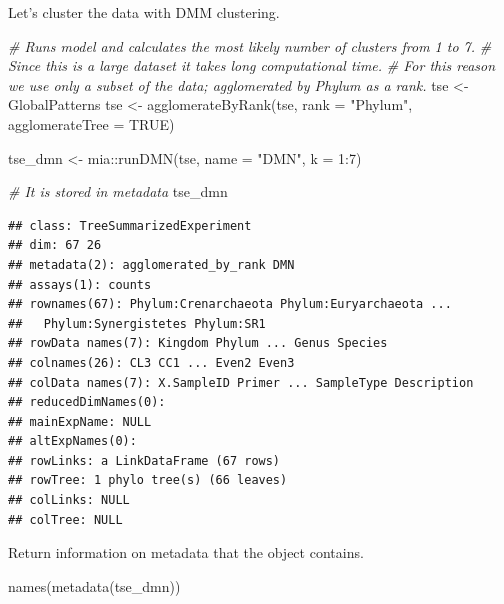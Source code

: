 \documentclass[
]{book}
\newenvironment{Shaded}{\begin{snugshade}}{\end{snugshade}}
\newcommand{\AttributeTok}[1]{\textcolor[rgb]{0.77,0.63,0.00}{#1}}
\newcommand{\CommentTok}[1]{\textcolor[rgb]{0.56,0.35,0.01}{\textit{#1}}}
\newcommand{\ConstantTok}[1]{\textcolor[rgb]{0.00,0.00,0.00}{#1}}
\newcommand{\DecValTok}[1]{\textcolor[rgb]{0.00,0.00,0.81}{#1}}
\newcommand{\FunctionTok}[1]{\textcolor[rgb]{0.00,0.00,0.00}{#1}}
\newcommand{\NormalTok}[1]{#1}
\newcommand{\OtherTok}[1]{\textcolor[rgb]{0.56,0.35,0.01}{#1}}
\newcommand{\SpecialCharTok}[1]{\textcolor[rgb]{0.00,0.00,0.00}{#1}}
\newcommand{\StringTok}[1]{\textcolor[rgb]{0.31,0.60,0.02}{#1}}
\begin{document}
Let's cluster the data with DMM clustering.

\begin{Shaded}
\begin{Highlighting}[]
\CommentTok{\# Runs model and calculates the most likely number of clusters from 1 to 7.}
\CommentTok{\# Since this is a large dataset it takes long computational time.}
\CommentTok{\# For this reason we use only a subset of the data; agglomerated by Phylum as a rank.}
\NormalTok{tse }\OtherTok{\textless{}{-}}\NormalTok{ GlobalPatterns}
\NormalTok{tse }\OtherTok{\textless{}{-}} \FunctionTok{agglomerateByRank}\NormalTok{(tse, }\AttributeTok{rank =} \StringTok{"Phylum"}\NormalTok{, }\AttributeTok{agglomerateTree =} \ConstantTok{TRUE}\NormalTok{)}
\end{Highlighting}
\end{Shaded}

\begin{Shaded}
\begin{Highlighting}[]
\NormalTok{tse\_dmn }\OtherTok{\textless{}{-}}\NormalTok{ mia}\SpecialCharTok{::}\FunctionTok{runDMN}\NormalTok{(tse, }\AttributeTok{name =} \StringTok{"DMN"}\NormalTok{, }\AttributeTok{k =} \DecValTok{1}\SpecialCharTok{:}\DecValTok{7}\NormalTok{)}
\end{Highlighting}
\end{Shaded}

\begin{Shaded}
\begin{Highlighting}[]
\CommentTok{\# It is stored in metadata}
\NormalTok{tse\_dmn}
\end{Highlighting}
\end{Shaded}

\begin{verbatim}
## class: TreeSummarizedExperiment 
## dim: 67 26 
## metadata(2): agglomerated_by_rank DMN
## assays(1): counts
## rownames(67): Phylum:Crenarchaeota Phylum:Euryarchaeota ...
##   Phylum:Synergistetes Phylum:SR1
## rowData names(7): Kingdom Phylum ... Genus Species
## colnames(26): CL3 CC1 ... Even2 Even3
## colData names(7): X.SampleID Primer ... SampleType Description
## reducedDimNames(0):
## mainExpName: NULL
## altExpNames(0):
## rowLinks: a LinkDataFrame (67 rows)
## rowTree: 1 phylo tree(s) (66 leaves)
## colLinks: NULL
## colTree: NULL
\end{verbatim}

Return information on metadata that the object contains.

\begin{Shaded}
\begin{Highlighting}[]
\FunctionTok{names}\NormalTok{(}\FunctionTok{metadata}\NormalTok{(tse\_dmn))}
\end{Highlighting}
\end{Shaded}
\end{document}
